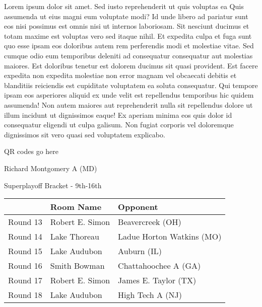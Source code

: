 \documentclass{article}%
\begin{document}
\vspace*{8pt}%
\linebreak%
\newline%
\newline%
Lorem ipsum dolor sit amet. Sed iusto reprehenderit ut quis voluptas ea Quis assumenda ut eius magni eum voluptate modi? Id unde libero ad pariatur sunt eos nisi possimus est omnis nisi ut internos laboriosam. Sit nesciunt ducimus et totam maxime est voluptas vero sed itaque nihil. Et expedita culpa et fuga sunt quo esse ipsam eos doloribus autem rem perferendis modi et molestiae vitae.\newline%
\newline%
Sed cumque odio eum temporibus deleniti ad consequatur consequatur aut molestias maiores. Est doloribus tenetur est dolorem ducimus sit quasi provident. Est facere expedita non expedita molestiae non error magnam vel obcaecati debitis et blanditiis reiciendis est cupiditate voluptatem ea soluta consequatur. Qui tempore ipsam eos asperiores aliquid ex unde velit est repellendus temporibus hic quidem assumenda!\newline%
\newline%
Non autem maiores aut reprehenderit nulla sit repellendus dolore ut illum incidunt ut dignissimos eaque! Ex aperiam minima eos quis dolor id consequatur eligendi ut culpa galisum. Non fugiat corporis vel doloremque dignissimos sit vero quasi sed voluptatem explicabo.\newline%
\newline%
%
\vspace*{30pt}%
\begin{center}%
\begin{Huge}%
QR codes go here%
\end{Huge}%
\end{center}%
\newpage%
\begin{center}%
\begin{Huge}%
Richard Montgomery A (MD)%
\end{Huge}%
\vspace*{8pt}%
\linebreak%
\begin{Large}%
Superplayoff Bracket {-} 9th{-}16th%
\end{Large}%
\end{center}%
%
\begin{tabularx}{\textwidth}{|c|Y|Y|}%
\hline%
&Room Name&Opponent\\%
\hline%
Round 13&Robert E. Simon&Beavercreek (OH)\\%
Round 14&Lake Thoreau&Ladue Horton Watkins (MO)\\%
Round 15&Lake Audubon&Auburn (IL)\\%
Round 16&Smith Bowman&Chattahoochee A (GA)\\%
Round 17&Robert E. Simon&James E. Taylor (TX)\\%
Round 18&Lake Audubon&High Tech A (NJ)\\%
\hline%
\end{tabularx}%
\end{document}
